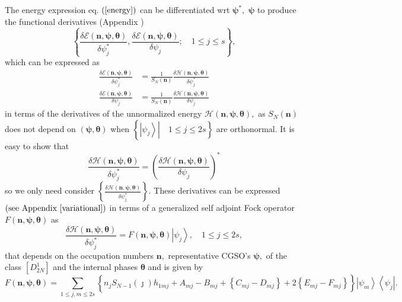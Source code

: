 \documentclass[aps,preprint]{revtex4}%
\begin{document}
The energy expression eq. $\left(  \ref{energy}\right)  $ can be
differentiated wrt $\mathbf{\psi}^{\ast},$ $\mathbf{\psi}$ to produce the
functional derivatives (Appendix )
\begin{equation}
\left\{  \frac{\delta\mathcal{E}\left(  \mathbf{n,\psi,\theta}\right)
}{\delta\psi_{j}^{\ast}},\frac{\delta\mathcal{E}\left(  \mathbf{n,\psi,\theta
}\right)  }{\delta\psi_{j}};\quad1\leq j\leq s\right\}  ,
\end{equation}
which can be expressed as%
\begin{align}
\frac{\delta\mathcal{E}\left(  \mathbf{n,\psi,\theta}\right)  }{\delta\psi
_{j}^{\ast}}  &  =\frac{1}{S_{N}\left(  \mathbf{n}\right)  }\frac
{\delta\mathcal{H}\left(  \mathbf{n,\psi,\theta}\right)  }{\delta\psi
_{j}^{\ast}}\\
\frac{\delta\mathcal{E}\left(  \mathbf{n,\psi,\theta}\right)  }{\delta\psi
_{j}}  &  =\frac{1}{S_{N}\left(  \mathbf{n}\right)  }\frac{\delta
\mathcal{H}\left(  \mathbf{n,\psi,\theta}\right)  }{\delta\psi_{j}}%
\end{align}
in terms of the derivatives of the unnormalized energy $\mathcal{H}\left(
\mathbf{n,\psi,\theta}\right)  ,$ as $S_{N}\left(  \mathbf{n}\right)  $ does
not depend on $\left(  \mathbf{\psi,\theta}\right)  $ when $\left\{  \left.
\left\vert \psi_{j}\right\rangle \right\vert \quad1\leq j\leq2s\right\}  $ are
orthonormal. It is easy to show that
\begin{equation}
\frac{\delta\mathcal{H}\left(  \mathbf{n,\psi,\theta}\right)  }{\delta\psi
_{j}^{\ast}}=\left(  \frac{\delta\mathcal{H}\left(  \mathbf{n,\psi,\theta
}\right)  }{\delta\psi_{j}}\right)  ^{\ast}%
\end{equation}
so we only need consider $\left\{  \frac{\delta\mathcal{H}\left(
\mathbf{n,\psi,\theta}\right)  }{\delta\psi_{j}^{\ast}}\right\}  .$ These
derivatives can be expressed $\left(  \text{see Appendix \ref{variational}%
}\right)  $ in terms of a generalized self adjoint Fock operator $F\left(
\mathbf{n,\psi,\theta}\right)  $ as
\begin{equation}
\frac{\delta\mathcal{H}\left(  \mathbf{n,\psi,\theta}\right)  }{\delta\psi
_{j}^{\ast}}=F\left(  \mathbf{n,\psi,\theta}\right)  \left\vert \psi
_{j}\right\rangle ,\quad1\leq j\leq2s,
\end{equation}
that depends on the occupation numbers $\mathbf{n,}$ representative CGSO's
$\mathbf{\psi,}$ of the class $\left[  D_{2N}^{1}\right]  $ and the internal
phases $\mathbf{\theta}$ and is given by
\begin{equation}
F\left(  \mathbf{n,\psi,\theta}\right)  =\sum_{1\leq j,m\leq2s}\left\{
n_{j}S_{N-1}\left(  \jmath\right)  h_{1mj}+A_{mj}-B_{mj}+\left\{
C_{mj}-D_{mj}\right\}  +2\overset{}{\left\{  E_{mj}-F_{mj}\right\}  }\right\}
\left\vert \psi_{m}\right\rangle \left\langle \psi_{j}\right\vert .
\label{genfock}%
\end{equation}
\end{document}
